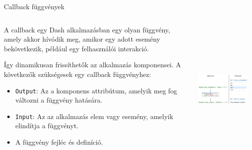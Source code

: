 \documentclass[english, aspectratio=169]{beamer}
\begin{document}
	\begin{frame}{Callback függvények}
		\begin{columns}
			\begin{column}{.5\textwidth}
				A callback egy Dash alkalmazásban egy olyan függvény, amely akkor hívódik meg, amikor egy adott esemény bekövetkezik, például egy felhasználói interakció.\par\smallskip
				Így dinamikusan frissíthetők az alkalmazás komponensei. A következők szükségesek egy callback függvényhez:
				\begin{itemize}
					\item \texttt{Output}: Az a komponens attribútum, amelyik meg fog változni a függvény hatására. 
					\item \texttt{Input}: Az az alkalmazás elem vagy esemény, amelyik elindítja a függvényt.
					\item A függvény fejléc és definíció. 
				\end{itemize}
			\end{column}
			\begin{column}{.5\textwidth}
				\begin{center}
					\includegraphics[width=7cm, height=7cm, keepaspectratio]{images/dash_13.png}
				\end{center}
			\end{column}
		\end{columns}
	\end{frame}
	
\end{document}

